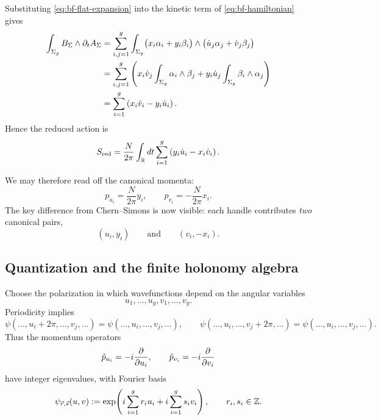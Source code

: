 \medskip

\noindent Substituting \eqref{eq:bf-flat-expansion} into the kinetic term of \eqref{eq:bf-hamiltonian} gives
\begin{align*}
\int_{\Sigma_g} B_\Sigma\wedge \partial_t A_\Sigma
&=
\sum_{i,j=1}^g
\int_{\Sigma_g}
\bigl(x_i\alpha_i+y_i\beta_i\bigr)\wedge
\bigl(\dot u_j\alpha_j+\dot v_j\beta_j\bigr) \\
&=
\sum_{i,j=1}^g
\left(
x_i\dot v_j\int_{\Sigma_g}\alpha_i\wedge\beta_j
+
y_i\dot u_j\int_{\Sigma_g}\beta_i\wedge\alpha_j
\right) \\
&=
\sum_{i=1}^g \left(x_i\dot v_i-y_i\dot u_i\right).
\end{align*}
Hence the reduced action is
\begin{equation}\label{eq:bf-reduced-action}
S_{\mathrm{red}}
=
\frac{N}{2\pi}\int_{\mathbb{R}} dt\sum_{i=1}^g \left(y_i\dot u_i-x_i\dot v_i\right).
\end{equation}

\noindent We may therefore read off the canonical momenta:
\begin{equation}\label{eq:bf-canonical-momenta}
p_{u_i}=\frac{N}{2\pi}y_i,
\qquad
p_{v_i}=-\frac{N}{2\pi}x_i.
\end{equation}
The key difference from Chern--Simons is now visible: each handle contributes \emph{two} canonical pairs,
\begin{equation*}
(u_i,y_i)
\qquad\text{and}\qquad
(v_i,-x_i).
\end{equation*}

\subsection{Quantization and the finite holonomy algebra}

Choose the polarization in which wavefunctions depend on the angular variables
\begin{equation*}
u_1,\dots,u_g,v_1,\dots,v_g.
\end{equation*}
Periodicity implies
\begin{equation*}
\psi(\dots,u_i+2\pi,\dots,v_j,\dots)=\psi(\dots,u_i,\dots,v_j,\dots),
\qquad
\psi(\dots,u_i,\dots,v_j+2\pi,\dots)=\psi(\dots,u_i,\dots,v_j,\dots).
\end{equation*}
Thus the momentum operators
\begin{equation*}
\hat p_{u_i}=-i\frac{\partial}{\partial u_i},
\qquad
\hat p_{v_i}=-i\frac{\partial}{\partial v_i}
\end{equation*}
have integer eigenvalues, with Fourier basis
\begin{equation}\label{eq:bf-fourier-basis}
\psi_{\vec r,\vec s}(u,v)
:=
\exp\!\left(i\sum_{i=1}^g r_i u_i + i\sum_{i=1}^g s_i v_i\right),
\qquad
r_i,s_i\in \mathbb{Z}.
\end{equation}

